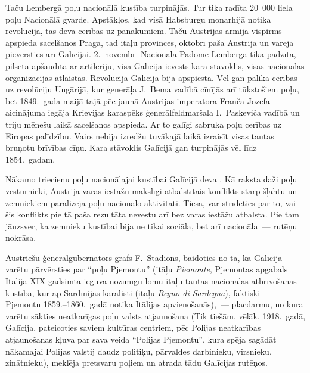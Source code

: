 \documentclass[twoside,a5paper,12pt,fleqn,openany]{extbook}
\newcommand{\ittxti}[1]{\textit{\textitalian{#1}}}
\begin{document}
Taču Lembergā poļu nacionālā kustība turpinājās. Tur tika radīta 20~000 liela poļu Nacionālā gvarde. Apstākļos, kad visā Habsburgu monarhijā notika revolūcija, tas deva cerības uz panākumiem. Taču Austrijas armija vispirms apspieda sacelšanos Prāgā, tad itāļu provincēs, oktobrī pašā Austrijā un varēja pievērsties arī Galīcijai. 2.~novembrī Nacionālā Padome Lembergā tika padzīta, pilsēta apšaudīta ar artilēriju, visā Galīcijā ievests kara stāvoklis, visas nacionālās organizācijas atlaistas. Revolūcija Galīcijā bija apspiesta. Vēl gan palika cerības uz revolūciju Ungārijā, kur ģenerāļa J.~Bema vadībā cīnījās arī tūkstošiem poļu, bet 1849.~gada maijā tajā pēc jaunā Austrijas imperatora Franča Jozefa aicinājuma iegāja Krievijas karaspēks ģenerālfeldmaršala I.~Paskeviča vadībā un triju mēnešu laikā sacelšanos apspieda. Ar to galīgi sabruka poļu cerības uz Eiropas palīdzību. Vairs nebija izredžu tuvākajā laikā izraisīt visas tautas bruņotu brīvības cīņu. Kara stāvoklis Galīcijā gan turpinājās vēl līdz 1854.~gadam.

Nākamo triecienu poļu nacionālajai kustībai Galīcijā deva . Kā raksta daži poļu vēsturnieki, Austrijā varas iestāžu mākslīgi atbalstītais konflikts starp šļahtu un zemniekiem paralizēja poļu nacionālo aktivitāti. Tiesa, var strīdēties par to, vai šis konflikts pie tā paša rezultāta nevestu arī bez varas iestāžu atbalsta. Pie tam jāuzsver, ka zemnieku kustībai bija ne tikai sociāla, bet arī nacionāla~--- rutēņu nokrāsa.

Austriešu ģenerālgubernators grāfs F.~Stadions, baidoties no tā, ka Galīcija varētu pārvērsties par ``poļu Pjemontu'' (itāļu \ittxti{Piemonte}, Pjemontas apgabals Itālijā XIX gadsimtā ieguva nozīmīgu lomu itāļu tautas nacionālās atbrīvošanās kustībā, kur ap Sardīnijas karalisti (itāļu \ittxti{Regno di Sardegna}), faktiski~--- Pjemontu 1859.--1860.~gadā notika Itālijas apvienošanās),~--- placdarmu, no kura varētu sākties neatkarīgas poļu valsts atjaunošana (Tik tiešām, vēlāk, 1918.~gadā, Galīcija, pateicoties saviem kultūras centriem, pēc Polijas neatkarības atjaunošanas kļuva par sava veida ``Polijas Pjemontu'', kura spēja sagādāt nākamajai Polijas valstij daudz politiķu, pārvaldes darbinieku, virsnieku, zinātnieku), meklēja pretsvaru poļiem un atrada tādu Galīcijas rutēņos.
\end{document}
